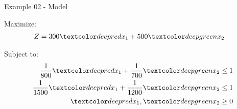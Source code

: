 \begin{frame}{Example 02 - Model}

Maximize:
\begin{align*}
    Z &= 300\colora{x_1} + 500\colorb{x_2}
\end{align*}

Subject to:
\begin{align*}
    \frac{1}{800 }\colora{x_1} + \frac{1}{700 }\colorb{x_2} &\le 1 \\
    \frac{1}{1500}\colora{x_1} + \frac{1}{1200}\colorb{x_2} &\le 1 \\
    \colora{x_1}, \colorb{x_2} &\ge 0
\end{align*}

\end{frame}

